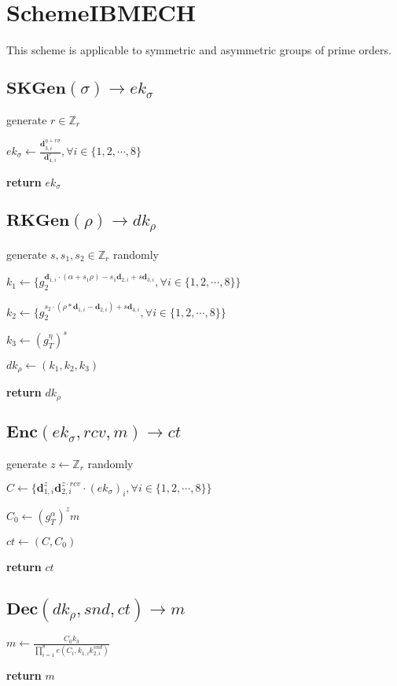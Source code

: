 \documentclass[a4paper]{article}
\begin{document}
\section{SchemeIBMECH}

This scheme is applicable to symmetric and asymmetric groups of prime orders. 

\subsection{$\textbf{SKGen}(\sigma) \rightarrow \textit{ek}_\sigma$}

generate $r \in \mathbb{Z}_r$

$\textit{ek}_\sigma \gets \frac{\bm{d}_{3, i}^{\eta + r \sigma}}{\bm{d}_{4, i}^r}, \forall i \in \{1, 2, \cdots, 8\}$

\textbf{return} $\textit{ek}_\sigma$

\subsection{$\textbf{RKGen}(\rho) \rightarrow \textit{dk}_\rho$}

generate $s, s_1, s_2 \in \mathbb{Z}_r$ randomly

$k_1 \gets \{g_2^{\bm{d}_{1, i} \cdot (\alpha + s_1 \rho) - s_1 \bm{d}_{2, i} + s \bm{d}_{3, i}}, \forall i \in \{1, 2, \cdots, 8\}\}$

$k_2 \gets \{g_2^{s_2 \cdot (\rho * \bm{d}_{1, i} - \bm{d}_{2, i}) + s \bm{d}_{4, i}}, \forall i \in \{1, 2, \cdots, 8\}\}$

$k_3 \gets (g_T^\eta)^s$

$\textit{dk}_\rho \gets (k_1, k_2, k_3)$

\textbf{return} $\textit{dk}_\rho$

\subsection{$\textbf{Enc}(\textit{ek}_\sigma, \textit{rcv}, m) \rightarrow \textit{ct}$}

generate $z \gets \mathbb{Z}_r$ randomly

$C \gets \{\bm{d}_{1, i}^z \bm{d}_{2, i}^{z \cdot \textit{rcv}} \cdot (\textit{ek}_\sigma)_i, \forall i \in \{1, 2, \cdots, 8\}\}$

$C_0 \gets (g_T^\alpha)^z m$

$\textit{ct} \gets (C, C_0)$

\textbf{return} $\textit{ct}$

\subsection{$\textbf{Dec}(\textit{dk}_\rho, \textit{snd}, \textit{ct}) \rightarrow m$}

$m \gets \frac{C_0 k_3}{\prod\limits_{i = 1}^8 e(C_i, k_{1, i} k_{2, i}^\textit{snd})}$

\textbf{return} $m$
\end{document}
